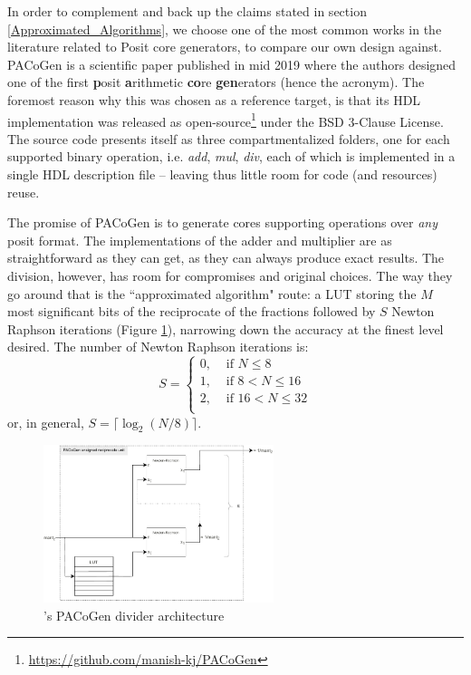 In order to complement and back up the claims stated in section \ref{Approximated_Algorithms}, we choose one of the most common works in the literature related to Posit core generators, to compare our own design against.
PACoGen \cite{PACoGen} is a scientific paper published in mid 2019 where the authors designed one of the first \textbf{p}osit \textbf{a}rithmetic \textbf{co}re \textbf{gen}erators (hence the acronym). The foremost reason why this was chosen as a reference target, is that its HDL implementation was released as open-source\footnote{\url{https://github.com/manish-kj/PACoGen}} under the BSD 3-Clause License.
The source code presents itself as three compartmentalized folders, one for each supported binary operation, i.e. \textit{add}, \textit{mul}, \textit{div}, each of which is implemented in a single HDL description file -- leaving thus little room for code (and resources) reuse.

The promise of PACoGen is to generate cores supporting operations over \textit{any} posit format.
The implementations of the adder and multiplier are as straightforward as they can get, as they can always produce exact results.
 The division, however, has room for compromises and original choices. The way they go around that is the ``approximated algorithm" route: a  LUT storing the $M$ most significant bits of the reciprocate of the fractions followed by $S$ Newton Raphson iterations (Figure \ref{fig:pacoge_divider_architecture}), narrowing down the accuracy at the finest level desired. The number of Newton Raphson iterations is:
    \begin{equation*}\label{equ:regime_k_equation}
        S = \begin{cases}
        0, &\text{ if } N \le 8 \\
        1, &\text{ if } 8 < N \leq 16 \\
        2, &\text{ if } 16 < N \le 32 \\
        \end{cases}
    \end{equation*}
    or, in general, $S = \lceil \log_2(N / 8) \rceil$.

\begin{figure}
    \centering
    \includegraphics[width=0.6\textwidth]{figures/div_pacogen_architecture.pdf}
    \caption{\cite{PACoGen}'s PACoGen divider architecture}
    \label{fig:pacoge_divider_architecture}
\end{figure}


